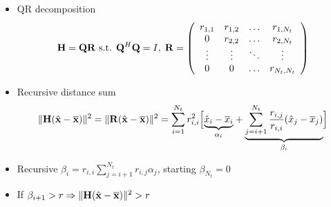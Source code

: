 \documentclass[xcolor=dvipsnames,aspectratio=169]{beamer}
\begin{document}
{  \begin{itemize}
            \item QR decomposition 
            $$\mathbf{H}=\mathbf{Q}\mathbf{R}\textnormal{ s.t. }\mathbf{Q}^H\mathbf{Q}=I,\;\mathbf{R}=\left(\begin{array}{cccc}
            r_{1,1}&r_{1,2}&\dots&r_{1,N_t}\\
            0&r_{2,2}&\dots&r_{2,N_t}\\
            \vdots&\vdots&\ddots&\vdots\\
            0&0&\dots&r_{N_t,N_t}\\
\end{array}\right)$$
            \item Recursive distance sum
$$\|\mathbf{H}(\hat{\mathbf{x}}-\overline{\mathbf{x}})\|^2=\|\mathbf{R}(\hat{\mathbf{x}}-\overline{\mathbf{x}})\|^2=\sum_{i=1}^{N_t}r_{i,i}^2\Big[\underset{\alpha_i}{\underbrace{\hat{x}_i-\overline{x}_i}}+\underset{\beta_i}{\underbrace{\sum_{j=i+1}^{N_t}\frac{r_{i,j}}{r_{i,i}}(\hat{x}_j-\overline{x}_j)}}\Big]$$
            \item Recursive $\beta_i=r_{i,i}\sum_{j=i+1}^{N_t}r_{i,j}\alpha_j$, starting $\beta_{N_t}=0$
            \item If $\beta_{i+1}>r\Rightarrow \|\mathbf{H}(\hat{\mathbf{x}}-\overline{\mathbf{x}})\|^2>r$
        \end{itemize}
  \begin{columns}
 \begin{column}{6cm}
 

\end{column}
\end{columns}}
\end{document}
